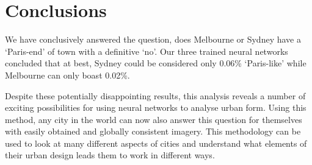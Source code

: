 \documentclass[urbansci,article,submit,moreauthors,pdftex]{Definitions/mdpi}
\begin{document}
\section{Conclusions}\label{sec:conclusion}

We have conclusively answered the question, does Melbourne or Sydney have a `Paris-end' of town with a definitive `no'. Our three trained neural networks concluded that at best, Sydney could be considered only 0.06\% `Paris-like' while Melbourne can only boast 0.02\%.   

Despite these potentially disappointing results, this analysis reveals a number of exciting possibilities for using neural networks to analyse urban form. Using this method, any city in the world can now also answer this question for themselves with easily obtained and globally consistent imagery. This methodology can be used to look at many different aspects of cities and understand what elements of their urban design leads them to work in different ways.


\vspace{6pt} 



\end{document}
